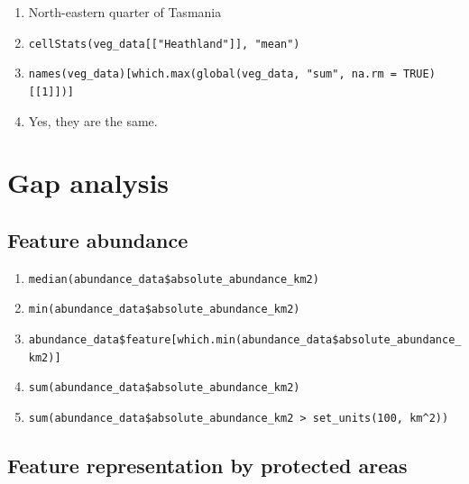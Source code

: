 \documentclass[
  12pt,
]{book}
\makeatletter
\providecommand{\tightlist}{%
  \setlength{\itemsep}{0pt}\setlength{\parskip}{0pt}}
\newenvironment{kframe}{%
\medskip{}
\setlength{\fboxsep}{.8em}
 \def\at@end@of@kframe{}%
 \ifinner\ifhmode%
  \def\at@end@of@kframe{\end{minipage}}%
  \begin{minipage}{\columnwidth}%
 \fi\fi%
 \def\FrameCommand##1{\hskip\@totalleftmargin \hskip-\fboxsep
 \colorbox{shadecolor}{##1}\hskip-\fboxsep
     \hskip-\linewidth \hskip-\@totalleftmargin \hskip\columnwidth}%
 \MakeFramed {\advance\hsize-\width
   \@totalleftmargin\z@ \linewidth\hsize
   \@setminipage}}%
 {\par\unskip\endMakeFramed%
 \at@end@of@kframe}
\newenvironment{rmdblock}[1]
  {
  \begin{itemize}
  \renewcommand{\labelitemi}{
    \raisebox{-.7\height}[0pt][0pt]{
      {\setkeys{Gin}{width=3em,keepaspectratio}\texttt{[image: images/\#1]}}
    }
  }
  \setlength{\fboxsep}{1em}
  \begin{kframe}
  \item
  }
  {
  \end{kframe}
  \end{itemize}
  }
\newenvironment{rmdanswer}
  {\begin{rmdblock}{answer}}
  {\end{rmdblock}}
\makeatother
\begin{document}
\begin{rmdanswer}
\begin{enumerate}
\def\labelenumi{\arabic{enumi}.}
\tightlist
\item
  North-eastern quarter of Tasmania
\item
  \texttt{cellStats(veg\_data{[}{[}"Heathland"{]}{]},\ "mean")}
\item
  \texttt{names(veg\_data){[}which.max(global(veg\_data,\ "sum",\ na.rm\ =\ TRUE){[}{[}1{]}{]}){]}}
\item
  Yes, they are the same.
\end{enumerate}
\end{rmdanswer}

\hypertarget{gap-analysis-1}{%
\section{Gap analysis}\label{gap-analysis-1}}

\hypertarget{feature-abundance-1}{%
\subsection{Feature abundance}\label{feature-abundance-1}}

\begin{rmdanswer}
\begin{enumerate}
\def\labelenumi{\arabic{enumi}.}
\tightlist
\item
  \texttt{median(abundance\_data\$absolute\_abundance\_km2)}
\item
  \texttt{min(abundance\_data\$absolute\_abundance\_km2)}
\item
  \texttt{abundance\_data\$feature{[}which.min(abundance\_data\$absolute\_abundance\_km2){]}}
\item
  \texttt{sum(abundance\_data\$absolute\_abundance\_km2)}
\item
  \texttt{sum(abundance\_data\$absolute\_abundance\_km2\ \textgreater{}\ set\_units(100,\ km\^{}2))}
\end{enumerate}
\end{rmdanswer}

\hypertarget{feature-representation-by-protected-areas-1}{%
\subsection{Feature representation by protected areas}\label{feature-representation-by-protected-areas-1}}
\end{document}
